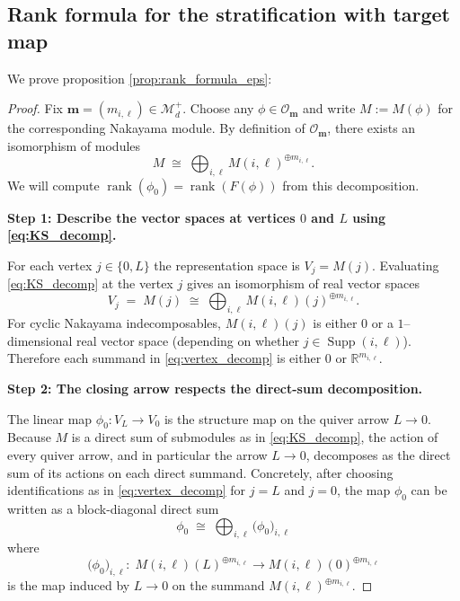 \documentclass{article}
\newcommand{\rank}{\operatorname{rank}}
\newcommand{\Supp}{\operatorname{Supp}}
\theoremstyle{definition}
\begin{document}
\subsection*{Rank formula for the stratification with target map}
We prove proposition \ref{prop:rank_formula_eps}:
\begin{proof}\label{proof:rank_formula_eps}
Fix $\mathbf m=(m_{i,\ell})\in \mathcal M_d^+$.
Choose any $\phi\in\mathcal O_{\mathbf m}$ and write $M:=M(\phi)$ for the corresponding Nakayama module.
By definition of $\mathcal O_{\mathbf m}$, there exists an isomorphism of modules
\begin{equation}
\label{eq:KS_decomp}
M \;\cong\;\bigoplus_{i,\ell} M(i,\ell)^{\oplus m_{i,\ell}}.
\end{equation}
We will compute $\rank(\phi_{0})=\rank(F(\phi))$ from this decomposition.

\medskip\noindent
\textbf{Step 1: Describe the vector spaces at vertices $0$ and $L$ using \eqref{eq:KS_decomp}.}

For each vertex $j\in\{0,L\}$ the representation space is $V_j=M(j)$.
Evaluating \eqref{eq:KS_decomp} at the vertex $j$ gives an isomorphism of real vector spaces
\begin{equation}
\label{eq:vertex_decomp}
V_j
\;=\;
M(j)
\;\cong\;
\bigoplus_{i,\ell} M(i,\ell)(j)^{\oplus m_{i,\ell}}.
\end{equation}
For cyclic Nakayama indecomposables, $M(i,\ell)(j)$ is either $0$ or a $1$--dimensional real vector space
(depending on whether $j\in \Supp(i,\ell)$). Therefore each summand in \eqref{eq:vertex_decomp} is either
$0$ or $\mathbb{R}^{m_{i,\ell}}$.

\medskip\noindent
\textbf{Step 2: The closing arrow respects the direct-sum decomposition.}

The linear map $\phi_{0}:V_L\to V_0$ is the structure map on the quiver arrow $L\to 0$.
Because $M$ is a direct sum of submodules as in \eqref{eq:KS_decomp}, the action of every quiver arrow,
and in particular the arrow $L\to 0$, decomposes as the direct sum of its actions on each direct summand.
Concretely, after choosing identifications as in \eqref{eq:vertex_decomp} for $j=L$ and $j=0$,
the map $\phi_{0}$ can be written as a block-diagonal direct sum
\begin{equation}
\label{eq:block_sum}
\phi_{0}
\;\cong\;
\bigoplus_{i,\ell}
\big(\phi_{0}\big)_{i,\ell}
\end{equation}
where
\[
\big(\phi_{0}\big)_{i,\ell}:\;
M(i,\ell)(L)^{\oplus m_{i,\ell}}
\longrightarrow
M(i,\ell)(0)^{\oplus m_{i,\ell}}
\]
is the map induced by $L\to 0$ on the summand $M(i,\ell)^{\oplus m_{i,\ell}}$.


\end{proof}
\end{document}
